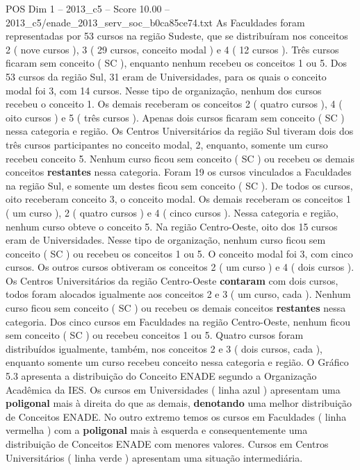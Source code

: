 \begin{textsample}{POS Dim 1 – 2013\_c5 – Score 10.00 – 2013\_c5/enade\_2013\_serv\_soc\_b0ca85ce74.txt}
As Faculdades foram representadas por 53 cursos na região Sudeste, que se distribuíram nos conceitos 2 ( nove cursos ), 3 ( 29 cursos, conceito modal ) e 4 ( 12 cursos ).
Três cursos ficaram sem conceito ( SC ), enquanto nenhum recebeu os conceitos 1 ou 5.
Dos 53 cursos da região Sul, 31 eram de Universidades, para os quais o conceito modal foi 3, com 14 cursos.
Nesse tipo de organização, nenhum dos cursos recebeu o conceito 1.
Os demais receberam os conceitos 2 ( quatro cursos ), 4 ( oito cursos ) e 5 ( três cursos ).
Apenas dois cursos ficaram sem conceito ( SC ) nessa categoria e região.
Os Centros Universitários da região Sul tiveram dois dos três cursos participantes no conceito modal, 2, enquanto, somente um curso recebeu conceito 5.
Nenhum curso ficou sem conceito ( SC ) ou recebeu os demais conceitos \textbf{restantes} nessa categoria.
Foram 19 os cursos vinculados a Faculdades na região Sul, e somente um destes ficou sem conceito ( SC ).
De todos os cursos, oito receberam conceito 3, o conceito modal.
Os demais receberam os conceitos 1 ( um curso ), 2 ( quatro cursos ) e 4 ( cinco cursos ).
Nessa categoria e região, nenhum curso obteve o conceito 5.
Na região Centro-Oeste, oito dos 15 cursos eram de Universidades.
Nesse tipo de organização, nenhum curso ficou sem conceito ( SC ) ou recebeu os conceitos 1 ou 5.
O conceito modal foi 3, com cinco cursos.
Os outros cursos obtiveram os conceitos 2 ( um curso ) e 4 ( dois cursos ).
Os Centros Universitários da região Centro-Oeste \textbf{contaram} com dois cursos, todos foram alocados igualmente aos conceitos 2 e 3 ( um curso, cada ).
Nenhum curso ficou sem conceito ( SC ) ou recebeu os demais conceitos \textbf{restantes} nessa categoria.
Dos cinco cursos em Faculdades na região Centro-Oeste, nenhum ficou sem conceito ( SC ) ou recebeu conceitos 1 ou 5.
Quatro cursos foram distribuídos igualmente, também, nos conceitos 2 e 3 ( dois cursos, cada ), enquanto somente um curso recebeu conceito nessa categoria e região.
O Gráfico 5.3 apresenta a distribuição do Conceito ENADE segundo a Organização Acadêmica da IES.
Os cursos em Universidades ( linha azul ) apresentam uma \textbf{poligonal} mais à direita do que as demais, \textbf{denotando} uma melhor distribuição de Conceitos ENADE.
No outro extremo temos os cursos em Faculdades ( linha vermelha ) com a \textbf{poligonal} mais à esquerda e consequentemente uma distribuição de Conceitos ENADE com menores valores.
Cursos em Centros Universitários ( linha verde ) apresentam uma situação intermediária.

\end{textsample}
